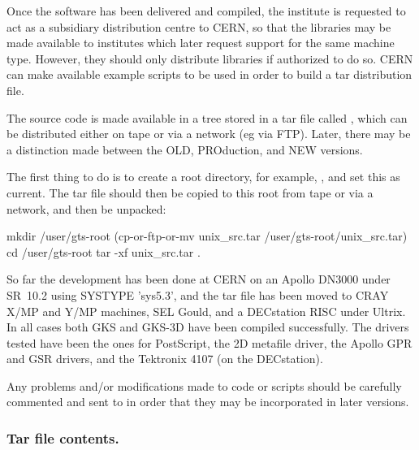 Once the software has been delivered and compiled, the institute
is requested to act as a subsidiary distribution centre to CERN,
so that the libraries may be made available to institutes
which later request support for the same machine type.
However, they should only distribute libraries if authorized to do so.
CERN can make available example scripts
to be used in order to build a tar distribution file.
 
The source code is made available in a tree stored in a tar file
called , which can be distributed either on tape or via
a network (eg via FTP).
Later, there may be a distinction made between the OLD, PROduction,
and NEW versions.
 
The first thing to do is to create a root directory,
for example, , and set this as current.
The tar file should then be copied to this root from
tape or via a network, and then be unpacked:

\begin{XMP} 
mkdir /user/gts-root
(cp-or-ftp-or-mv  unix_src.tar /user/gts-root/unix_src.tar)
cd    /user/gts-root
tar   -xf unix_src.tar .
\end{XMP}
 
So far the development has been done at CERN on an Apollo DN3000
under SR~10.2 using SYSTYPE 'sys5.3', and the tar file has been moved
to CRAY X/MP and Y/MP machines, SEL Gould, and a DECstation RISC under Ultrix.
In all cases both GKS and GKS-3D have been compiled successfully.
The drivers tested have been the ones for PostScript, the 2D metafile driver,
the Apollo GPR and GSR drivers, and the Tektronix 4107 (on the DECstation).
 
Any problems and/or modifications made to code or scripts should be
carefully commented and sent to  in order that
they may be incorporated in later versions.
\subsubsection{\protect\label{sec:tarref}Tar file contents.}
 
